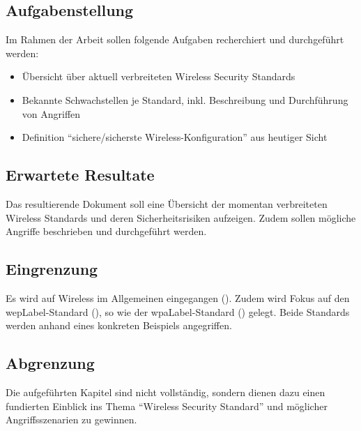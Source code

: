 \subsection{Aufgabenstellung}
Im Rahmen der Arbeit sollen folgende Aufgaben recherchiert und durchgeführt werden:
\begin{itemize}
	\item Übersicht über aktuell verbreiteten Wireless Security Standards
	\item Bekannte Schwachstellen je Standard, inkl. Beschreibung und Durchführung von Angriffen
	\item Definition "`sichere/sicherste Wireless-Konfiguration"' aus heutiger Sicht
\end{itemize}

\subsection{Erwartete Resultate}
Das resultierende Dokument soll eine Übersicht der momentan verbreiteten Wireless Standards und deren Sicherheitsrisiken aufzeigen.
Zudem sollen mögliche Angriffe beschrieben und durchgeführt werden.

\subsection{Eingrenzung}
Es wird auf Wireless im Allgemeinen eingegangen ().
Zudem wird Fokus auf den \gls{wepLabel}-Standard (), so wie der \gls{wpaLabel}-Standard () gelegt. Beide Standards werden anhand eines konkreten Beispiels angegriffen.

\subsection{Abgrenzung}
Die aufgeführten Kapitel sind nicht vollständig, sondern dienen dazu einen fundierten Einblick ins Thema "`Wireless Security Standard"' und möglicher Angriffsszenarien zu gewinnen.

